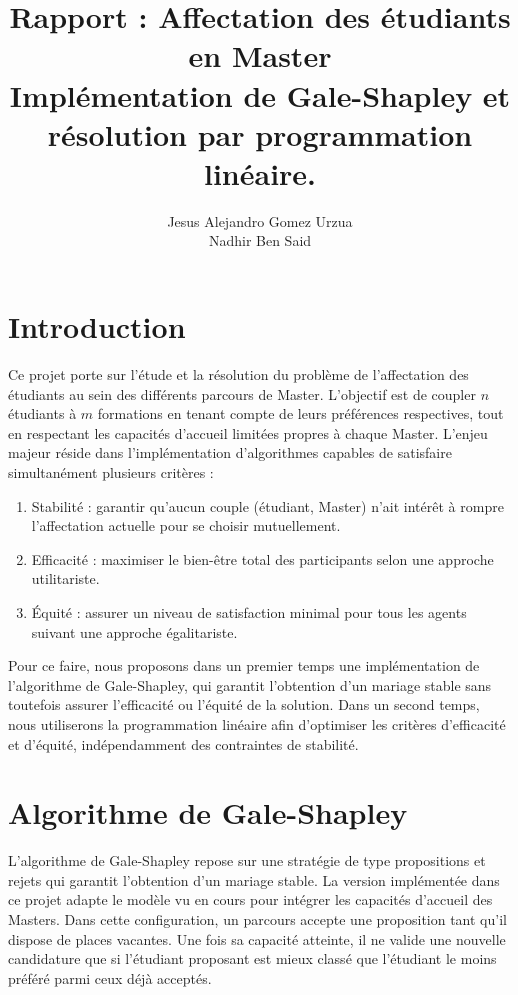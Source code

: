 \documentclass{article}
\title{ \textbf{Rapport : Affectation des étudiants en Master}\\
      \vspace{0.3cm}
      \large Implémentation de Gale-Shapley et résolution par programmation linéaire.}
\author{Jesus Alejandro Gomez Urzua\\Nadhir Ben Said}
\begin{document}
\maketitle
\tableofcontents
\vspace{0.3cm}

\section{Introduction}

Ce projet porte sur l'étude et la résolution du problème de l'affectation des étudiants au sein 
des différents parcours de Master. L'objectif est de coupler $n$ étudiants à $m$ formations en tenant 
compte de leurs préférences respectives, tout en respectant les capacités d'accueil limitées propres 
à chaque Master. L'enjeu majeur réside dans l'implémentation d'algorithmes capables de satisfaire simultanément 
plusieurs critères :  
\begin{enumerate}
      \item Stabilité : garantir qu'aucun couple (étudiant, Master) n'ait intérêt à rompre l'affectation 
      actuelle pour se choisir mutuellement.
      \item Efficacité : maximiser le bien-être total des participants selon une approche utilitariste.
      \item Équité : assurer un niveau de satisfaction minimal pour tous les agents suivant une approche égalitariste.
\end{enumerate}  
Pour ce faire, nous proposons dans un premier temps une implémentation de l'algorithme de Gale-Shapley, 
qui garantit l'obtention d'un mariage stable sans toutefois assurer l'efficacité ou l'équité de la solution. 
Dans un second temps, nous utiliserons la programmation linéaire afin d'optimiser les critères d'efficacité 
et d'équité, indépendamment des contraintes de stabilité.  

\section{Algorithme de Gale-Shapley}

L'algorithme de Gale-Shapley repose sur une stratégie de type \og propositions et rejets \fg{} 
qui garantit l'obtention d'un mariage stable. La version implémentée dans ce projet adapte 
le modèle vu en cours pour intégrer les capacités d'accueil des Masters. Dans cette configuration, 
un parcours accepte une proposition tant qu'il dispose de places vacantes. Une fois sa capacité 
atteinte, il ne valide une nouvelle candidature que si l'étudiant proposant est mieux classé que 
l'étudiant le moins préféré parmi ceux déjà acceptés.
\end{document}
